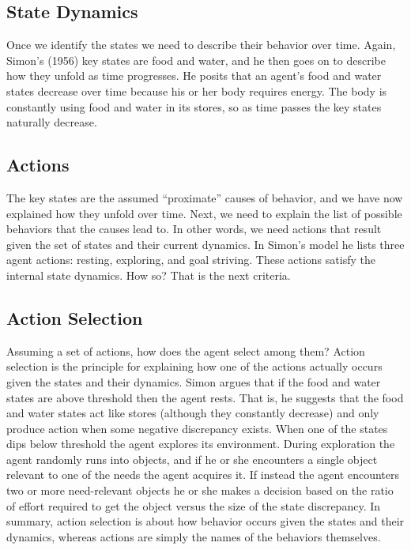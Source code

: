 \documentclass[english,,man]{apa6}
\theoremstyle{definition}
\theoremstyle{definition}
\theoremstyle{definition}
\theoremstyle{remark}
\begin{document}
\hypertarget{state-dynamics}{%
\subsection{State Dynamics}\label{state-dynamics}}

Once we identify the states we need to describe their behavior over
time. Again, Simon's (1956) key states are food and water, and he then
goes on to describe how they unfold as time progresses. He posits that
an agent's food and water states decrease over time because his or her
body requires energy. The body is constantly using food and water in its
stores, so as time passes the key states naturally decrease.

\hypertarget{actions}{%
\subsection{Actions}\label{actions}}

The key states are the assumed \enquote{proximate} causes of behavior,
and we have now explained how they unfold over time. Next, we need to
explain the list of possible behaviors that the causes lead to. In other
words, we need actions that result given the set of states and their
current dynamics. In Simon's model he lists three agent actions:
resting, exploring, and goal striving. These actions satisfy the
internal state dynamics. How so? That is the next criteria.

\hypertarget{action-selection}{%
\subsection{Action Selection}\label{action-selection}}

Assuming a set of actions, how does the agent select among them? Action
selection is the principle for explaining how one of the actions
actually occurs given the states and their dynamics. Simon argues that
if the food and water states are above threshold then the agent rests.
That is, he suggests that the food and water states act like stores
(although they constantly decrease) and only produce action when some
negative discrepancy exists. When one of the states dips below threshold
the agent explores its environment. During exploration the agent
randomly runs into objects, and if he or she encounters a single object
relevant to one of the needs the agent acquires it. If instead the agent
encounters two or more need-relevant objects he or she makes a decision
based on the ratio of effort required to get the object versus the size
of the state discrepancy. In summary, action selection is about how
behavior occurs given the states and their dynamics, whereas actions are
simply the names of the behaviors themselves.
\end{document}
